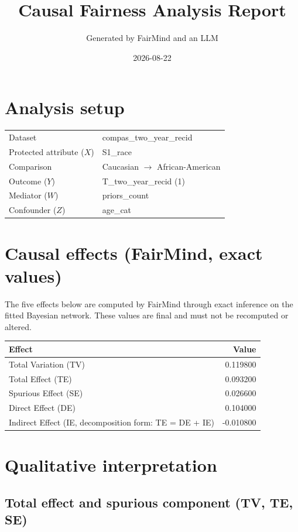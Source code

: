 \documentclass[11pt]{article}
\title{Causal Fairness Analysis Report}
\author{Generated by FairMind and an LLM}
\date{2026-08-22}
\begin{document}
\maketitle

\section{Analysis setup}

\begin{tabular}{ll}
\toprule
Dataset & compas\_two\_year\_recid \\
Protected attribute ($X$) & S1\_race \\
Comparison & Caucasian $\to$ African-American \\
Outcome ($Y$) & T\_two\_year\_recid (1) \\
Mediator ($W$) & priors\_count \\
Confounder ($Z$) & age\_cat \\
\bottomrule
\end{tabular}

\section{Causal effects (FairMind, exact values)}

The five effects below are computed by FairMind through exact inference on the
fitted Bayesian network. These values are final and must not be recomputed or
altered.

\begin{tabular}{lr}
\toprule
Effect & Value \\
\midrule
Total Variation (TV) & 0.119800 \\
Total Effect (TE) & 0.093200 \\
Spurious Effect (SE) & 0.026600 \\
Direct Effect (DE) & 0.104000 \\
Indirect Effect (IE, decomposition form: TE = DE + IE) & -0.010800 \\
\bottomrule
\end{tabular}

\section{Qualitative interpretation}

\subsection{Total effect and spurious component (TV, TE, SE)}
\end{document}
